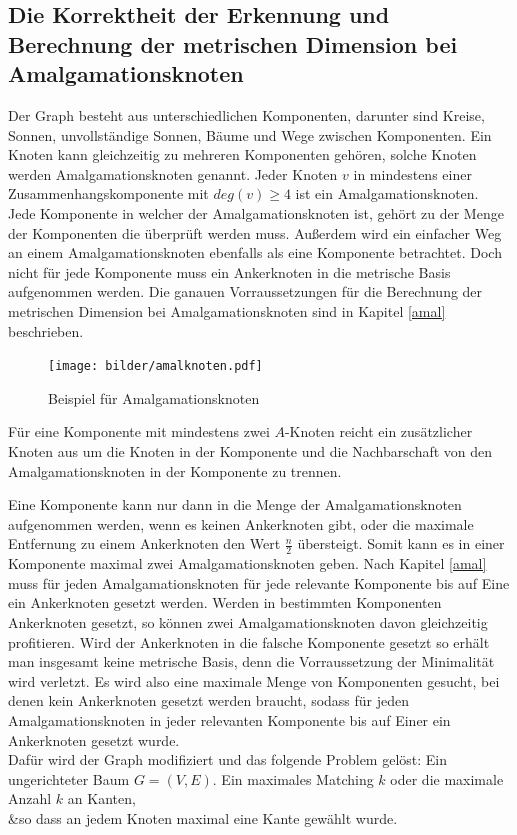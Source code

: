 \subsection{Die Korrektheit der Erkennung und Berechnung der metrischen Dimension bei Amalgamationsknoten}
\label{korramal}
Der Graph besteht aus unterschiedlichen Komponenten, darunter sind Kreise, Sonnen, unvollständige Sonnen, Bäume und Wege zwischen Komponenten. Ein Knoten kann gleichzeitig zu mehreren Komponenten gehören, solche Knoten werden Amalgamationsknoten genannt.\newline 
Jeder Knoten $v$ in mindestens einer Zusammenhangskomponente mit $deg(v)\geq 4$ ist ein Amalgamationsknoten.\\
Jede Komponente in welcher der Amalgamationsknoten ist, gehört zu der Menge der Komponenten die überprüft werden muss. Außerdem wird ein einfacher Weg an einem Amalgamationsknoten ebenfalls als eine Komponente betrachtet. Doch nicht für jede Komponente muss ein Ankerknoten in die metrische Basis aufgenommen werden.
Die ganauen Vorraussetzungen für die Berechnung der metrischen Dimension bei Amalgamationsknoten sind in Kapitel \ref{amal} beschrieben.
\begin{figure}[h!]
		\centering 		 
   \texttt{[image: bilder/amalknoten.pdf]}
	\caption{Beispiel für Amalgamationsknoten}
  	 \end{figure}
  	 
\begin{lem}
Für eine Komponente mit mindestens zwei $A$-Knoten reicht ein zusätzlicher Knoten aus um die Knoten in der Komponente und die Nachbarschaft von den Amalgamationsknoten in der Komponente zu trennen.
\end{lem}
Eine Komponente kann nur dann in die Menge der Amalgamationsknoten aufgenommen werden, wenn es keinen Ankerknoten gibt, oder die maximale Entfernung zu einem Ankerknoten den Wert $\frac{n}{2}$ übersteigt. Somit kann es in einer Komponente maximal zwei Amalgamationsknoten geben.
Nach Kapitel \ref{amal} muss für jeden Amalgamationsknoten für jede relevante Komponente bis auf Eine ein Ankerknoten gesetzt werden. Werden in bestimmten Komponenten Ankerknoten gesetzt, so können zwei Amalgamationsknoten davon gleichzeitig profitieren. Wird der Ankerknoten in die falsche Komponente gesetzt so erhält man insgesamt keine metrische Basis, denn die Vorraussetzung der Minimalität wird verletzt. Es wird also eine maximale Menge von Komponenten gesucht, bei denen kein Ankerknoten gesetzt werden braucht, sodass für jeden Amalgamationsknoten in jeder relevanten Komponente bis auf Einer ein Ankerknoten gesetzt wurde.\\
Dafür wird der Graph modifiziert und das folgende Problem gelöst:
\vspace{-1mm}
{Ein ungerichteter Baum $G=(V,E)$.}
{Ein maximales Matching $k$ oder die maximale Anzahl $k$ an Kanten,\\&so dass an jedem Knoten maximal eine Kante gewählt wurde.}

